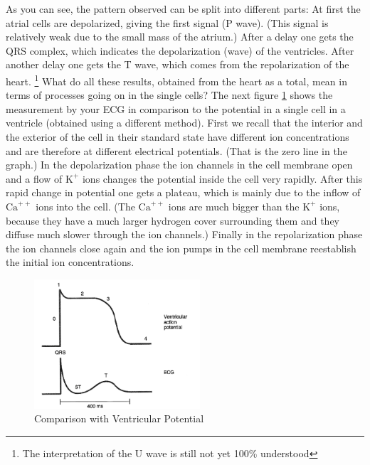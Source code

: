 As you can see, the pattern observed can be split into different parts: At first the atrial cells are depolarized, giving the first signal (P wave). (This signal is relatively weak due to the small mass of the atrium.) After a delay one gets the QRS complex, which indicates the depolarization (wave) of the ventricles. After another delay one gets the T wave, which comes from the repolarization of the heart. \footnote{The interpretation of the U wave is still not yet 100\% understood} What do all these results, obtained from the heart as a total, mean in terms of processes going on in the single cells? The next figure \ref{fig:ventricule} shows the measurement by your ECG in comparison to the potential in a single cell in a ventricle (obtained using a different method). First we recall that the interior and the exterior of the cell in their standard state have different ion concentrations and are therefore at different electrical potentials. (That is the zero line in the graph.) In the depolarization phase the ion channels in the cell membrane open and a flow of $\mathrm{K}^+$ ions changes the potential inside the cell very rapidly. After this rapid change in potential one gets a plateau, which is mainly due to the inflow of $\mathrm{Ca}^{++}$ ions into the cell. (The $\mathrm{Ca}^{++}$ ions are much bigger than the $\mathrm{K}^+$ ions, because they have a much larger hydrogen cover surrounding them and they diffuse much slower through the ion channels.) Finally in the repolarization phase the ion channels close again and the ion pumps in the cell membrane reestablish the initial ion concentrations. \myskip

\begin{figure}[h]
    \begin{center}
        \includegraphics[width=0.55\textwidth]{./Exp1/pic/image6.png}
    \end{center}
    \caption{Comparison with Ventricular Potential}
    \label{fig:ventricule}
\end{figure}


